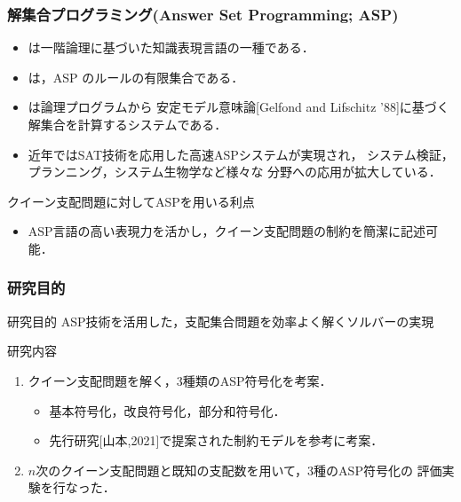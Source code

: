 \documentclass[dvipdfmx,10pt]{beamer}
\begin{document}
\begin{frame}\frametitle{解集合プログラミング(Answer Set Programming; ASP)}
 \begin{itemize}
  \item {}は一階論理に基づいた知識表現言語の一種である．
  \item {}は，ASP のルールの有限集合である．
  \item {}は論理プログラムから
	安定モデル意味論[Gelfond and Lifschitz '88]に基づく
	解集合を計算するシステムである．
  \item 近年ではSAT技術を応用した高速ASPシステムが実現され，
	システム検証，プランニング，システム生物学など様々な
	分野への応用が拡大している．
 \end{itemize}
 \begin{alertblock}{クイーン支配問題に対してASPを用いる利点}
  \begin{itemize}
   \item ASP言語の高い表現力を活かし，クイーン支配問題の制約を簡潔に記述可能．
  \end{itemize}
 \end{alertblock}
\end{frame}
 
%
%

\begin{frame}\frametitle{研究目的}
 \begin{alertblock}{研究目的}\centering
  ASP技術を活用した，支配集合問題を効率よく解くソルバーの実現
 \end{alertblock}
 \begin{block}{研究内容}
  \begin{enumerate}
   \item クイーン支配問題を解く，3種類のASP符号化を考案．
	 \begin{itemize}
	  \item 基本符号化，改良符号化，部分和符号化．
	  \item 先行研究[山本,2021]で提案された制約モデルを参考に考案．
	 \end{itemize}
   \item $n$次のクイーン支配問題と既知の支配数を用いて，3種のASP符号化の
	 評価実験を行なった．
  \end{enumerate}
 \end{block}
\end{frame}
\end{document}
